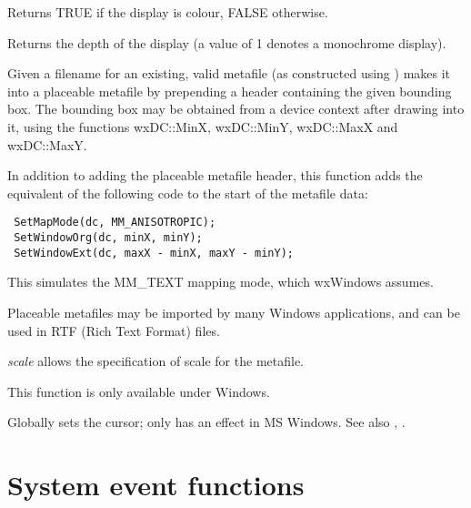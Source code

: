 

Returns TRUE if the display is colour, FALSE otherwise.



Returns the depth of the display (a value of 1 denotes a monochrome display).

\label{wxmakemetafileplaceable}


Given a filename for an existing, valid metafile (as constructed using )
makes it into a placeable metafile by prepending a header containing the given
bounding box. The bounding box may be obtained from a device context after drawing
into it, using the functions wxDC::MinX, wxDC::MinY, wxDC::MaxX and wxDC::MaxY.

In addition to adding the placeable metafile header, this function adds
the equivalent of the following code to the start of the metafile data:

\begin{verbatim}
 SetMapMode(dc, MM_ANISOTROPIC);
 SetWindowOrg(dc, minX, minY);
 SetWindowExt(dc, maxX - minX, maxY - minY);
\end{verbatim}

This simulates the MM\_TEXT mapping mode, which wxWindows assumes.

Placeable metafiles may be imported by many Windows applications, and can be
used in RTF (Rich Text Format) files.

{\it scale} allows the specification of scale for the metafile.

This function is only available under Windows.

\label{wxsetcursor}


Globally sets the cursor; only has an effect in MS Windows.
See also , .

\section{System event functions}

